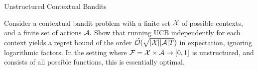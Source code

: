 \begin{exercise}[]{Unstructured Contextual Bandits}
\end{exercise}
Consider a contextual bandit problem with a finite set $\mathcal{X}$ of possible contexts, 
and a finite set of actions $\mathcal{A}.$
Show that running UCB independently for each context yields a regret bound of the order $\widetilde {\mathcal{O}}(\sqrt{|\mathcal{X}||\mathcal{A}|T})$ in expectation, ignoring logarithmic factors.
In the setting where $\mathcal{F} = \mathcal{X} \times \mathcal{A} \to [0, 1]$ is unstructured, and consists of all possible functions, this is essentially optimal.

\begin{solution}[TODO]
\end{solution}
